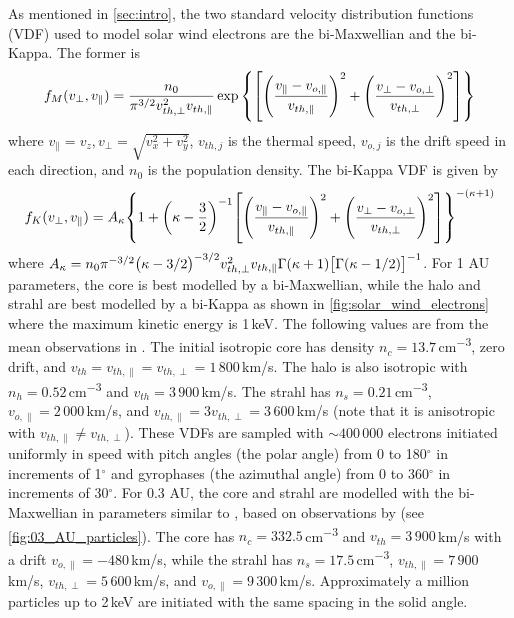 As mentioned in \cref{sec:intro}, the two standard velocity distribution
functions (VDF) used to model solar wind electrons are the bi-Maxwellian and the bi-Kappa. The former is
\begin{equation}\label{eq:maxwellian}
    f_M(v_\perp,v_\|)=\frac{n_0}{\pi^{3/2}v_{th,\perp}^2v_{th,\|}}\exp\qty{\qty[\qty(\frac{v_\|-v_{o,\|}}{v_{th,\|}})^2+\qty(\frac{v_\perp-v_{o,\perp}}{v_{th,\perp}})^2]}
\end{equation}
where $v_\|=v_z,v_\perp=\sqrt{v_x^2+v_y^2}$, $v_{th,j}$ is the thermal speed, $v_{o,j}$ is the drift speed in each direction, and $n_0$ is the population density. The bi-Kappa VDF is given by
\begin{equation}\label{eq:kappa}
    f_K(v_\perp,v_\|)=A_\kappa\qty{1+\qty(\kappa-\frac32)^{-1}\qty[\qty(\frac{v_\|-v_{o,\|}}{v_{th,\|}})^2+\qty(\frac{v_\perp-v_{o,\perp}}{v_{th,\perp}})^2]}^{-\qty(\kappa+1)}
\end{equation}
where
$A_\kappa=n_0\pi^{-3/2}\qty(\kappa-3/2)^{-3/2}v_{th,\perp}^2v_{th,\|}\Gamma(\kappa+1)\qty[\Gamma(\kappa-1/2)]^{-1}$. For 1 AU parameters, the core is best modelled by a bi-Maxwellian, while the halo and strahl are best modelled by a bi-Kappa as shown in \cref{fig:solar_wind_electrons} where the maximum kinetic energy is 1\,\si{keV}. The following values are from the mean observations in \cite{Wilson2019}. The initial isotropic core has density
$n_c=13.7$\,\si{cm\tothe{-3}}, zero drift, and
$v_{th}=v_{th,\|}=v_{th,\perp}=1\,800$\,\si{km/s}. The halo is also isotropic
with $n_h=0.52$\,\si{cm\tothe{-3}} and $v_{th}=3\,900$\,\si{km/s}. The strahl
has $n_s=0.21$\,\si{cm\tothe{-3}}, $v_{o,\|}=2\,000$\,\si{km/s}, and
$v_{th,\|}=3v_{th,\perp}=3\,600$\,\si{km/s} (note that it is anisotropic with
$v_{th,\|}\neq v_{th,\perp}$). These VDFs are sampled with
$\sim400\,000$ electrons initiated uniformly in speed with pitch angles (the
polar angle) from 0 to 180$^\circ$ in increments of 1$^\circ$ and gyrophases
(the azimuthal angle) from 0 to 360$^\circ$ in increments of 30$^\circ$. For 0.3
AU, the core and strahl are modelled with the bi-Maxwellian
in parameters similar to \cite{Micera2020}, based on observations by
\cite{Halekas2020} (see \cref{fig:03_AU_particles}). The core has $n_c=332.5$\,\si{cm\tothe{-3}} and $v_{th}=3\,900$\,\si{km/s} with a drift $v_{o,\|}=-480$\,\si{km/s}, while the strahl has $n_s=17.5$\,\si{cm\tothe{-3}}, $v_{th,\|}=7\,900$\,\si{km/s},
$v_{th,\perp}=5\,600$\,\si{km/s}, and $v_{o,\|}=9\,300$\,\si{km/s}.
Approximately a million particles up to 2\,\si{keV} are initiated with the same 
spacing in the solid angle.


